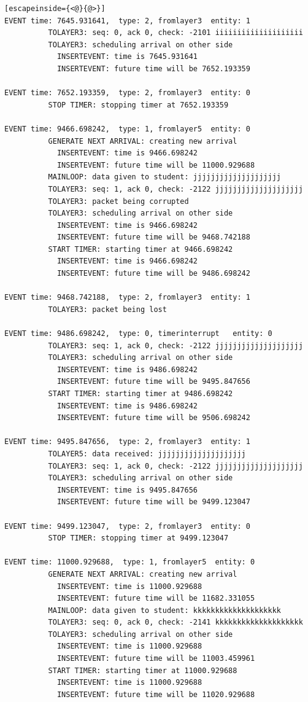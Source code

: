 \documentclass[paper=a4, fontsize=11pt]{scrartcl}
\numberwithin{equation}{section}		%
\numberwithin{figure}{section}			%
\numberwithin{table}{section}				%
\begin{document}
\begin{lstlisting}[escapeinside={<@}{@>}]
EVENT time: 7645.931641,  type: 2, fromlayer3  entity: 1
          TOLAYER3: seq: 0, ack 0, check: -2101 iiiiiiiiiiiiiiiiiiii
          TOLAYER3: scheduling arrival on other side
            INSERTEVENT: time is 7645.931641
            INSERTEVENT: future time will be 7652.193359

EVENT time: 7652.193359,  type: 2, fromlayer3  entity: 0
          STOP TIMER: stopping timer at 7652.193359

EVENT time: 9466.698242,  type: 1, fromlayer5  entity: 0
          GENERATE NEXT ARRIVAL: creating new arrival
            INSERTEVENT: time is 9466.698242
            INSERTEVENT: future time will be 11000.929688
          MAINLOOP: data given to student: jjjjjjjjjjjjjjjjjjjj
          TOLAYER3: seq: 1, ack 0, check: -2122 jjjjjjjjjjjjjjjjjjjj
          TOLAYER3: packet being corrupted
          TOLAYER3: scheduling arrival on other side
            INSERTEVENT: time is 9466.698242
            INSERTEVENT: future time will be 9468.742188
          START TIMER: starting timer at 9466.698242
            INSERTEVENT: time is 9466.698242
            INSERTEVENT: future time will be 9486.698242

EVENT time: 9468.742188,  type: 2, fromlayer3  entity: 1
          TOLAYER3: packet being lost

EVENT time: 9486.698242,  type: 0, timerinterrupt   entity: 0
          TOLAYER3: seq: 1, ack 0, check: -2122 jjjjjjjjjjjjjjjjjjjj
          TOLAYER3: scheduling arrival on other side
            INSERTEVENT: time is 9486.698242
            INSERTEVENT: future time will be 9495.847656
          START TIMER: starting timer at 9486.698242
            INSERTEVENT: time is 9486.698242
            INSERTEVENT: future time will be 9506.698242

EVENT time: 9495.847656,  type: 2, fromlayer3  entity: 1
          TOLAYER5: data received: jjjjjjjjjjjjjjjjjjjj
          TOLAYER3: seq: 1, ack 0, check: -2122 jjjjjjjjjjjjjjjjjjjj
          TOLAYER3: scheduling arrival on other side
            INSERTEVENT: time is 9495.847656
            INSERTEVENT: future time will be 9499.123047

EVENT time: 9499.123047,  type: 2, fromlayer3  entity: 0
          STOP TIMER: stopping timer at 9499.123047

EVENT time: 11000.929688,  type: 1, fromlayer5  entity: 0
          GENERATE NEXT ARRIVAL: creating new arrival
            INSERTEVENT: time is 11000.929688
            INSERTEVENT: future time will be 11682.331055
          MAINLOOP: data given to student: kkkkkkkkkkkkkkkkkkkk
          TOLAYER3: seq: 0, ack 0, check: -2141 kkkkkkkkkkkkkkkkkkkk
          TOLAYER3: scheduling arrival on other side
            INSERTEVENT: time is 11000.929688
            INSERTEVENT: future time will be 11003.459961
          START TIMER: starting timer at 11000.929688
            INSERTEVENT: time is 11000.929688
            INSERTEVENT: future time will be 11020.929688


\end{lstlisting}
\end{document}
